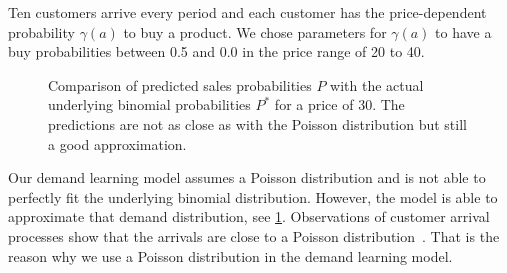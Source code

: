 Ten customers arrive every period and each customer has the price-dependent probability $\gamma(a)$ to buy a product.
We chose parameters for $\gamma(a)$ to have a buy probabilities between 0.5 and 0.0 in the price range of 20 to 40.

\begin{figure}[t]
	\caption[Comparison of predicted probabilites with underlying binomial probabilities]{Comparison of predicted sales probabilities $P$ with the actual underlying binomial probabilities $P^*$ for a price of 30. The predictions are not as close as with the Poisson distribution but still a good approximation.}
	\label{fig:probs_binom}
\end{figure}

Our demand learning model assumes a Poisson distribution and is not able to perfectly fit the underlying binomial distribution.
However, the model is able to approximate that demand distribution, see \cref{fig:probs_binom}.
Observations of customer arrival processes show that the arrivals are close to a Poisson distribution~\cite{DBLP:journals/ior/Wolff82}.
That is the reason why we use a Poisson distribution in the demand learning model.

